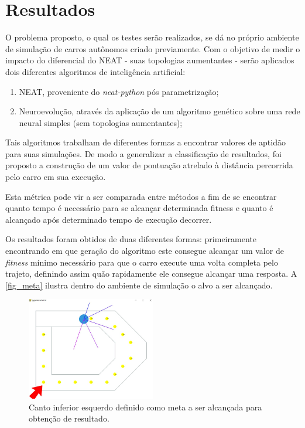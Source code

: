 \chapter{Resultados}

O problema proposto, o qual os testes serão realizados, se dá no próprio
ambiente de simulação de carros autônomos criado previamente. Com o objetivo de
medir o impacto do diferencial do NEAT - suas topologias aumentantes - serão
aplicados dois diferentes algoritmos de inteligência artificial:

\begin{enumerate}
	\item NEAT, proveniente do \textit{neat-python} pós parametrização; 
	\item Neuroevolução, através da aplicação de um algoritmo genético sobre uma rede neural simples (sem topologias aumentantes);
\end{enumerate}

Tais algoritmos trabalham de diferentes formas a encontrar valores de aptidão
para suas simulações. De modo a generalizar a classificação de resultados, foi
proposto a construção de um valor de pontua{\c c}{\~a}o atrelado à distância percorrida pelo
carro em sua execução.

Esta métrica pode vir a ser comparada entre métodos a fim de se encontrar
quanto tempo é necessário para se alcançar determinada fitness e quanto é
alcançado após determinado tempo de execução decorrer.

Os resultados foram obtidos de duas diferentes formas: primeiramente
encontrando em que geração do algoritmo este consegue alcançar um valor de
\textit{fitness} mínimo necessário para que o carro execute uma volta completa pelo
trajeto, definindo assim quão rapidamente ele consegue alcançar uma resposta. A
\autoref{fig_meta} ilustra dentro do ambiente de simulação o alvo a ser alcançado.

\begin{figure}[htb]
        \centering
        \caption{\label{fig_meta}Canto inferior esquerdo definido como meta a ser alcançada para obtenção de resultado.}
        \includegraphics[width=0.5\textwidth]{images/meta.png}
\end{figure}

